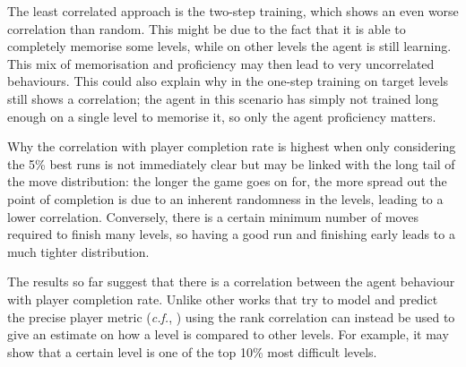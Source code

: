 \documentclass[conference]{IEEEtran}
\begin{document}
The least correlated approach is the two-step training, which shows an even worse correlation than random.
This might be due to the fact that it is able to completely memorise some levels, while on other levels the agent is still learning.
This mix of memorisation and proficiency may then lead to very uncorrelated behaviours.
This could also explain why in the one-step training on target levels still shows a correlation; the agent in this scenario has simply not trained long enough on a single level to memorise it, so only the agent proficiency matters.

Why the correlation with player completion rate is highest when only considering the 5\% best runs is not immediately clear but may be linked with the long tail of the move distribution: the longer the game goes on for, the more spread out the point of completion is due to an inherent randomness in the levels, leading to a lower correlation.
Conversely, there is a certain minimum number of moves required to finish many levels, so having a good run and finishing early leads to a much tighter distribution.

The results so far suggest that there is a correlation between the agent behaviour with player completion rate.
Unlike other works that try to model and predict the precise player metric (\emph{c.f.}, \cite{Gudmundsson2017}) using the rank correlation can instead be used to give an estimate on how a level is compared to other levels.
For example, it may show that a certain level is one of the top 10\% most difficult levels.
\end{document}

